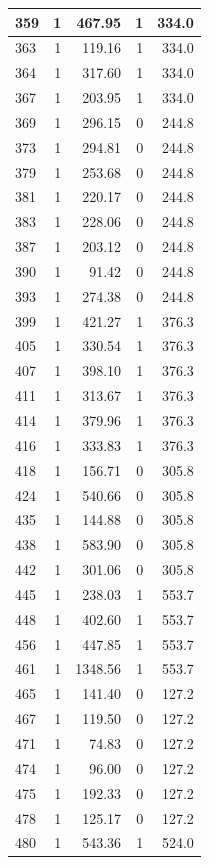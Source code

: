 \documentclass[
  spanish,
  12pt,
]{book}
\begin{document}
\begin{tabular}{l|r|r|r|r}
\hline
359 & 1 & 467.95 & 1 & 334.0\\
\hline
363 & 1 & 119.16 & 1 & 334.0\\
\hline
364 & 1 & 317.60 & 1 & 334.0\\
\hline
367 & 1 & 203.95 & 1 & 334.0\\
\hline
369 & 1 & 296.15 & 0 & 244.8\\
\hline
373 & 1 & 294.81 & 0 & 244.8\\
\hline
379 & 1 & 253.68 & 0 & 244.8\\
\hline
381 & 1 & 220.17 & 0 & 244.8\\
\hline
383 & 1 & 228.06 & 0 & 244.8\\
\hline
387 & 1 & 203.12 & 0 & 244.8\\
\hline
390 & 1 & 91.42 & 0 & 244.8\\
\hline
393 & 1 & 274.38 & 0 & 244.8\\
\hline
399 & 1 & 421.27 & 1 & 376.3\\
\hline
405 & 1 & 330.54 & 1 & 376.3\\
\hline
407 & 1 & 398.10 & 1 & 376.3\\
\hline
411 & 1 & 313.67 & 1 & 376.3\\
\hline
414 & 1 & 379.96 & 1 & 376.3\\
\hline
416 & 1 & 333.83 & 1 & 376.3\\
\hline
418 & 1 & 156.71 & 0 & 305.8\\
\hline
424 & 1 & 540.66 & 0 & 305.8\\
\hline
435 & 1 & 144.88 & 0 & 305.8\\
\hline
438 & 1 & 583.90 & 0 & 305.8\\
\hline
442 & 1 & 301.06 & 0 & 305.8\\
\hline
445 & 1 & 238.03 & 1 & 553.7\\
\hline
448 & 1 & 402.60 & 1 & 553.7\\
\hline
456 & 1 & 447.85 & 1 & 553.7\\
\hline
461 & 1 & 1348.56 & 1 & 553.7\\
\hline
465 & 1 & 141.40 & 0 & 127.2\\
\hline
467 & 1 & 119.50 & 0 & 127.2\\
\hline
471 & 1 & 74.83 & 0 & 127.2\\
\hline
474 & 1 & 96.00 & 0 & 127.2\\
\hline
475 & 1 & 192.33 & 0 & 127.2\\
\hline
478 & 1 & 125.17 & 0 & 127.2\\
\hline
480 & 1 & 543.36 & 1 & 524.0\\

\end{tabular}
\end{document}

